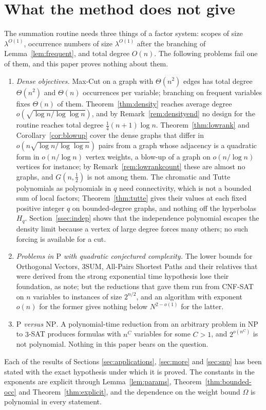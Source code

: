\section{What the method does not give}\label{sec:scope}

The summation routine needs three things of a factor system: scopes of size
$\lambda^{O(1)}$, occurrence numbers of size $\lambda^{O(1)}$ after the
branching of Lemma~\ref{lem:frequent}, and total degree $O(n)$. The following
problems fail one of them, and this paper proves nothing about them.

\begin{enumerate}[label=(\alph*),leftmargin=2.2em]
\item \emph{Dense objectives.} Max-Cut on a graph with $\Theta(n^2)$ edges has
total degree $\Theta(n^2)$ and $\Theta(n)$ occurrences per variable; branching
on frequent variables fixes $\Theta(n)$ of them. Theorem~\ref{thm:density}
reaches average degree $o(\sqrt{\log n/\log\log n})$, and by
Remark~\ref{rem:densityend} no design for the routine reaches total degree
$\frac14(n+1)\log n$. Theorem~\ref{thm:lowrank} and Corollary~\ref{cor:blowup} cover the dense graphs
that differ in $o(n\sqrt{\log n/\log\log n})$ pairs from a graph whose adjacency is
a quadratic form in $o(n/\log n)$ vertex weights, a blow-up of a graph on
$o(n/\log n)$ vertices for instance; by Remark~\ref{rem:lowrankcount} these are
almost no graphs, and $G(n,\frac12)$ is not among them. The
chromatic and Tutte polynomials as polynomials in $q$ need connectivity, which
is not a bounded sum of local factors; Theorem~\ref{thm:tutte} gives their
values at each fixed positive integer $q$ on bounded-degree graphs, and nothing
off the hyperbolas $H_q$. Section~\ref{ssec:indep} shows that the independence
polynomial escapes the density limit because a vertex of large degree forces
many others; no such forcing is available for a cut.
\item \emph{Problems in $\mathrm{P}$ with quadratic conjectured complexity.}
The lower bounds for Orthogonal Vectors, $3$SUM, All-Pairs Shortest Paths and
their relatives that were derived from the strong exponential time hypothesis
lose their foundation, as \oai{} note; but the reductions that gave them run
from CNF-SAT on $n$ variables to instances of size $2^{n/2}$, and an algorithm
with exponent $o(n)$ for the former gives nothing below $N^{2-o(1)}$ for the
latter.
\item \emph{$\mathrm{P}$ versus $\mathrm{NP}$.} A polynomial-time reduction
from an arbitrary problem in $\mathrm{NP}$ to $3$-SAT produces formulas with
$n^{C}$ variables for some $C>1$, and $2^{o(n^{C})}$ is not polynomial.
Nothing in this paper bears on the question.
\end{enumerate}

Each of the results of Sections \ref{sec:applications}, \ref{sec:more} and \ref{sec:snp} has
been stated with the exact hypothesis under which it is proved. The constants
in the exponents are explicit through Lemma~\ref{lem:params},
Theorem~\ref{thm:bounded-occ} and Theorem~\ref{thm:explicit}, and the dependence on the weight bound $\Omega$
is polynomial in every statement.
